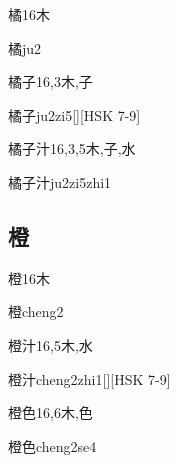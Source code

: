 \begin{Entry}{橘}{16}{⽊}
  \begin{Phonetics}{橘}{ju2}
  \end{Phonetics}
\end{Entry}

\begin{Entry}{橘子}{16,3}{⽊,⼦}
  \begin{Phonetics}{橘子}{ju2zi5}[][HSK 7-9]
  \end{Phonetics}
\end{Entry}

\begin{Entry}{橘子汁}{16,3,5}{⽊,⼦,⽔}
  \begin{Phonetics}{橘子汁}{ju2zi5zhi1}
  \end{Phonetics}
\end{Entry}

\subsection*{橙}

\begin{Entry}{橙}{16}{⽊}
  \begin{Phonetics}{橙}{cheng2}
  \end{Phonetics}
\end{Entry}

\begin{Entry}{橙汁}{16,5}{⽊,⽔}
  \begin{Phonetics}{橙汁}{cheng2zhi1}[][HSK 7-9]
  \end{Phonetics}
\end{Entry}

\begin{Entry}{橙色}{16,6}{⽊,⾊}
  \begin{Phonetics}{橙色}{cheng2se4}
  \end{Phonetics}
\end{Entry}


